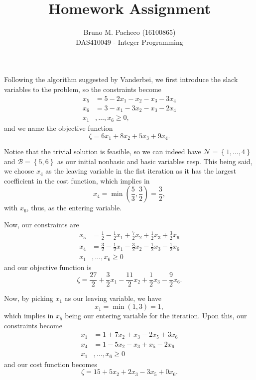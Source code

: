 \documentclass[a4paper]{report}
\begin{document}
 
\title{Homework Assignment}
\author{Bruno M. Pacheco (16100865)\\
DAS410049 - Integer Programming}
 
\maketitle
 

Following the algorithm suggested by Vanderbei, we first introduce the slack variables to the problem, so the constraints become
\begin{align*}
    x_5 &= 5 - 2x_1 - x_2 - x_3 - 3x_4 \\
    x_6 &= 3 - x_1 - 3x_2 - x_3 - 2x_4  \\
    x_1&,\ldots,x_6 \ge 0
,\end{align*}
and we name the objective function \[
\zeta = 6x_1 + 8x_2 + 5x_3 + 9x_4
.\] 

Notice that the trivial solution is feasible, so we can indeed have $\mathcal{N}=\left\{ 1,\ldots,4 \right\} $ and $\mathcal{B} = \left\{ 5,6 \right\} $ as our initial nonbasic and basic variables resp. This being said, we choose $x_4$ as the leaving variable in the fist iteration as it has the largest coefficient in the cost function, which implies in \[
x_4 = \min \left( \frac{5}{3}, \frac{3}{2} \right) = \frac{3}{2}
,\] with $x_6$, thus, as the entering variable.

Now, our constraints are
\begin{align*}
    x_5 &= \frac{1}{2} - \frac{1}{2}x_1 + \frac{7}{2}x_2 + \frac{1}{2}x_3 + \frac{3}{2}x_6 \\
    x_4 &= \frac{3}{2} - \frac{1}{2}x_1 - \frac{3}{2}x_2 - \frac{1}{2}x_3 - \frac{1}{2}x_6  \\
    x_1&,\ldots,x_6 \ge 0
\end{align*}
and our objective function is \[
\zeta = \frac{27}{2} + \frac{3}{2}x_1 - \frac{11}{2}x_2 +\frac{1}{2}x_3 - \frac{9}{2}x_6
.\] 

Now, by picking $x_1$ as our leaving variable, we have \[
x_1 = \min\left( 1, 3 \right) = 1
,\] which implies in $x_5$ being our entering variable for the iteration. Upon this, our constraints become
\begin{align*}
    x_1 &= 1 + 7x_2 + x_3 -2x_5 + 3x_6 \\
    x_4 &= 1 - 5x_2 - x_3 +x_5 -2x_6  \\
    x_1&,\ldots,x_6 \ge 0
\end{align*}
and our cost function becomes \[
\zeta = 15 + 5x_2 + 2x_3 -3x_5 + 0x_6
.\] 
\end{document}
